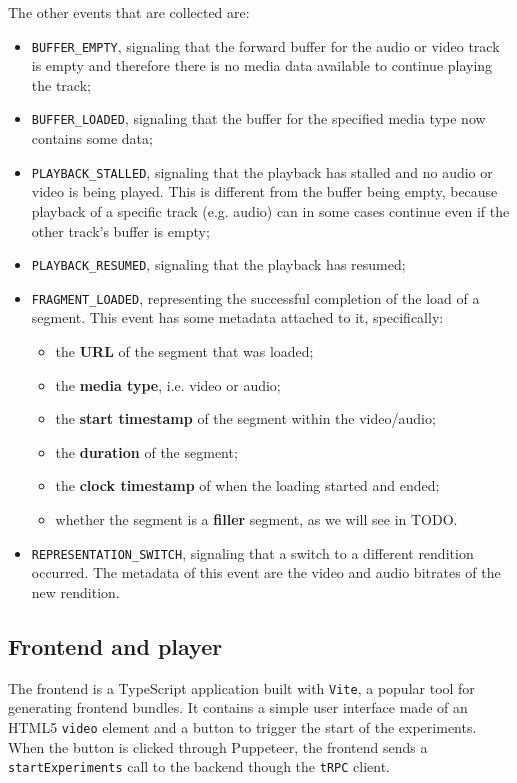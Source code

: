 The other events that are collected are:

\begin{itemize}
    \item \texttt{BUFFER\_EMPTY}, signaling that the forward buffer for the audio or video track is empty and therefore there is no media data available to continue playing the track;
    \item \texttt{BUFFER\_LOADED}, signaling that the buffer for the specified media type now contains some data;
    \item \texttt{PLAYBACK\_STALLED}, signaling that the playback has stalled and no audio or video is being played. This is different from the buffer being empty, because playback of a specific track (e.g. audio) can in some cases continue even if the other track's buffer is empty;
    \item \texttt{PLAYBACK\_RESUMED}, signaling that the playback has resumed;
    \item \texttt{FRAGMENT\_LOADED}, representing the successful completion of the load of a segment. This event has some metadata attached to it, specifically:
        \begin{itemize}
            \item the \textbf{URL} of the segment that was loaded;
            \item the \textbf{media type}, i.e. video or audio;
            \item the \textbf{start timestamp} of the segment within the video/audio;
            \item the \textbf{duration} of the segment;
            \item the \textbf{clock timestamp} of when the loading started and ended;
            \item whether the segment is a \textbf{filler} segment, as we will see in TODO.
        \end{itemize}
    \item \texttt{REPRESENTATION\_SWITCH}, signaling that a switch to a different rendition occurred. The metadata of this event are the video and audio bitrates of the new rendition.
\end{itemize}

\subsection{Frontend and player}
\label{sec:eval/testbed/frontend}

The frontend is a TypeScript application built with \texttt{Vite}, a popular tool for generating frontend bundles. It contains a simple user interface made of an HTML5 \texttt{video} element and a button to trigger the start of the experiments. When the button is clicked through Puppeteer, the frontend sends a \texttt{startExperiments} call to the backend though the \texttt{tRPC} client.

